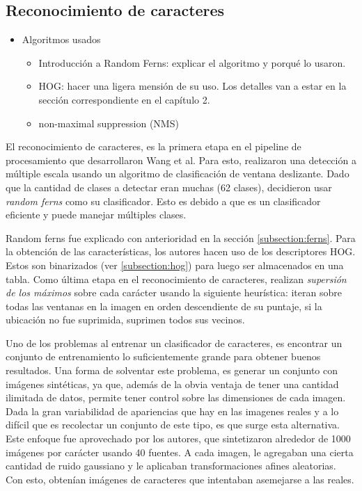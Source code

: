\subsection{Reconocimiento de caracteres}

	\begin{itemize}
		\item Algoritmos usados
			\begin{itemize}
				\item Introducción a Random Ferns: explicar el algoritmo y porqué lo usaron.
				\item HOG: hacer una ligera mensión de su uso. Los detalles van a estar en la sección correspondiente en el capítulo 2.
				\item non-maximal suppression (NMS) 
			\end{itemize}
	\end{itemize}
	
	
	El reconocimiento de caracteres, es la primera etapa en el pipeline de procesamiento que desarrollaron Wang et al. Para esto, realizaron una detección a múltiple escala usando un algoritmo de clasificación de ventana deslizante. Dado que la cantidad de clases a detectar eran muchas (62 clases), decidieron usar \textit{random ferns} como su clasificador. Esto es debido a que es un clasificador eficiente y puede manejar múltiples clases.
	
	Random ferns fue explicado con anterioridad en la sección \ref{subsection:ferns}. Para la obtención de las características, los autores hacen uso de los descriptores HOG. Estos son binarizados (ver \ref{subsection:hog}) para luego ser almacenados en una tabla. Como última etapa en el reconocimiento de caracteres, realizan \textit{supersión de los máximos} sobre cada carácter usando la siguiente heurística: iteran sobre todas las ventanas en la imagen en orden descendiente de su puntaje, si la ubicación no fue suprimida, suprimen todos sus vecinos.
	
	Uno de los problemas al entrenar un clasificador de caracteres, es encontrar un conjunto de entrenamiento lo suficientemente grande para obtener buenos resultados. Una forma de solventar este problema, es generar un conjunto con imágenes sintéticas, ya que, además de la  obvia ventaja de tener una cantidad ilimitada de datos, permite tener control sobre las dimensiones de cada imagen. Dada la gran variabilidad de apariencias que hay en las imagenes reales y a lo difícil que es recolectar un conjunto de este tipo, es que surge esta alternativa. Este enfoque fue aprovechado por los autores, que sintetizaron alrededor de 1000 imágenes por carácter usando 40 fuentes. A cada imagen, le agregaban una cierta cantidad de ruido gaussiano y le aplicaban transformaciones afines aleatorias. Con esto, obtenían imágenes de caracteres que intentaban asemejarse a las reales.

	

